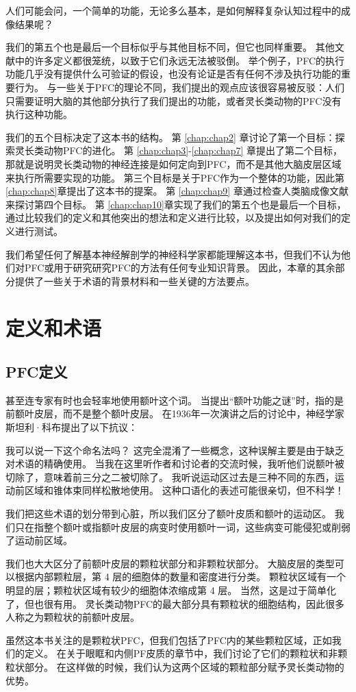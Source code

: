 人们可能会问，一个简单的功能，无论多么基本，是如何解释复杂认知过程中的成像结果呢？
\par
我们的第五个也是最后一个目标似乎与其他目标不同，但它也同样重要。
其他文献中的许多定义都很笼统，以致于它们永远无法被驳倒。
举个例子，PFC的执行功能几乎没有提供什么可验证的假设，也没有论证是否有任何不涉及执行功能的重要行为。
与一些关于PFC的理论不同，我们提出的观点应该很容易被反驳：人们只需要证明大脑的其他部分执行了我们提出的功能，或者灵长类动物的PFC没有执行这种功能。
\par
我们的五个目标决定了这本书的结构。
第 \ref{chap:chap2} 章讨论了第一个目标：探索灵长类动物PFC的进化。
第 \ref{chap:chap3}-\ref{chap:chap7} 章提出了第二个目标，那就是说明灵长类动物的神经连接是如何定向到PFC，而不是其他大脑皮层区域来执行所需要实现的功能。
第三个目标是关于PFC作为一个整体的功能，因此第 \ref{chap:chap8}章提出了这本书的提案。
第 \ref{chap:chap9} 章通过检查人类脑成像文献来探讨第四个目标。
第 \ref{chap:chap10}章实现了我们的第五个也是最后一个目标，通过比较我们的定义和其他突出的想法和定义进行比较，以及提出如何对我们的定义进行测试。
\par
我们希望任何了解基本神经解剖学的神经科学家都能理解这本书，但我们不认为他们对PFC或用于研究研究PFC的方法有任何专业知识背景。
因此，本章的其余部分提供了一些关于术语的背景材料和一些关键的方法要点。



\section{定义和术语}
\subsection{PFC定义}
甚至连专家有时也会轻率地使用额叶这个词。
当提出“额叶功能之谜”时，指的是前额叶皮层，而不是整个额叶皮层\cite{teube1964riddle}。
在1936年一次演讲之后的讨论中，神经学家斯坦利·科布提出了以下抗议\cite{fulton1932relation}：
\par
我可以说一下这个命名法吗？
这完全混淆了一些概念，这种误解主要是由于缺乏对术语的精确使用。
当我在这里听作者和讨论者的交流时候，我听他们说额叶被切除了，意味着前三分之二被切除了。
我听说运动区过去是三种不同的东西，运动前区域和锥体束同样松散地使用。
这种口语化的表述可能很亲切，但不科学！
\par
我们把这些术语的划分带到心脏，所以我们区分了额叶皮质和额叶的运动区。
我们只在指整个额叶或指额叶皮层的病变时使用额叶一词，这些病变可能侵犯或削弱了运动前区域。
\par
我们也大大区分了前额叶皮层的颗粒状部分和非颗粒状部分。
大脑皮层的类型可以根据内部颗粒层，第 4 层的细胞体的数量和密度进行分类。
颗粒状区域有一个明显的层；颗粒状区域有较少的细胞体浓缩成第 4 层。
当然，这是过于简单化了，但也很有用。
灵长类动物PFC的最大部分具有颗粒状的细胞结构，因此很多人称之为颗粒状的前额叶皮层。
\par
虽然这本书关注的是颗粒状PFC，但我们包括了PFC内的某些颗粒区域，正如我们的定义。
在关于眼眶和内侧PF皮质的章节中，我们讨论了它们的颗粒状和非颗粒状部分。
在这样做的时候，我们认为这两个区域的颗粒部分赋予灵长类动物的优势。

